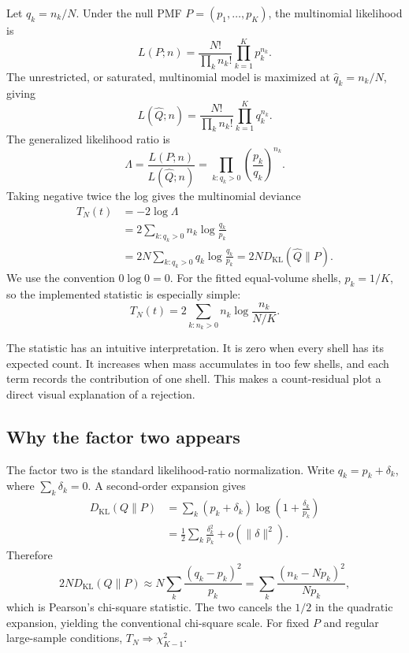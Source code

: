 \documentclass[11pt]{article}
\newcommand{\KL}{D_{\mathrm{KL}}}
\begin{document}
Let $q_k=n_k/N$. Under the null PMF $P=(p_1,\ldots,p_K)$, the multinomial
likelihood is
\begin{equation}
  L(P;n)=\frac{N!}{\prod_k n_k!}\prod_{k=1}^{K}p_k^{n_k}.
  \label{eq:null-likelihood}
\end{equation}
The unrestricted, or saturated, multinomial model is maximized at
$\widehat q_k=n_k/N$, giving
\begin{equation}
  L(\widehat Q;n)=\frac{N!}{\prod_k n_k!}\prod_{k=1}^{K}q_k^{n_k}.
  \label{eq:saturated-likelihood}
\end{equation}
The generalized likelihood ratio is
\begin{equation}
  \Lambda
  =\frac{L(P;n)}{L(\widehat Q;n)}
  =\prod_{k:q_k>0}\left(\frac{p_k}{q_k}\right)^{n_k}.
\end{equation}
Taking negative twice the log gives the multinomial deviance
\begin{align}
  T_N(t)
  &=-2\log\Lambda \\
  &=2\sum_{k:q_k>0}n_k\log\frac{q_k}{p_k} \\
  &=2N\sum_{k:q_k>0}q_k\log\frac{q_k}{p_k}
    =2N\KL(\widehat Q\|P).
  \label{eq:lrt-statistic}
\end{align}
We use the convention $0\log0=0$. For the fitted equal-volume shells,
$p_k=1/K$, so the implemented statistic is especially simple:
\begin{equation}
  T_N(t)=2\sum_{k:n_k>0}n_k\log\frac{n_k}{N/K}.
  \label{eq:equal-shell-lrt}
\end{equation}

The statistic has an intuitive interpretation. It is zero when every shell has
its expected count. It increases when mass accumulates in too few shells, and
each term records the contribution of one shell. This makes a count-residual
plot a direct visual explanation of a rejection.

\subsection{Why the factor two appears}

The factor two is the standard likelihood-ratio normalization. Write
$q_k=p_k+\delta_k$, where $\sum_k\delta_k=0$. A second-order expansion gives
\begin{equation}
\begin{aligned}
  \KL(Q\|P)
  &=\sum_k(p_k+\delta_k)\log\left(1+\frac{\delta_k}{p_k}\right) \\
  &=\frac{1}{2}\sum_k\frac{\delta_k^2}{p_k}+o(\|\delta\|^2).
\end{aligned}
\end{equation}
Therefore
\begin{equation}
  2N\KL(Q\|P)
  \approx N\sum_k\frac{(q_k-p_k)^2}{p_k}
  =\sum_k\frac{(n_k-Np_k)^2}{Np_k},
  \label{eq:pearson-equivalence}
\end{equation}
which is Pearson's chi-square statistic. The two cancels the $1/2$ in the
quadratic expansion, yielding the conventional chi-square scale. For fixed
$P$ and regular large-sample conditions, $T_N\Rightarrow\chi^2_{K-1}$.
\end{document}
